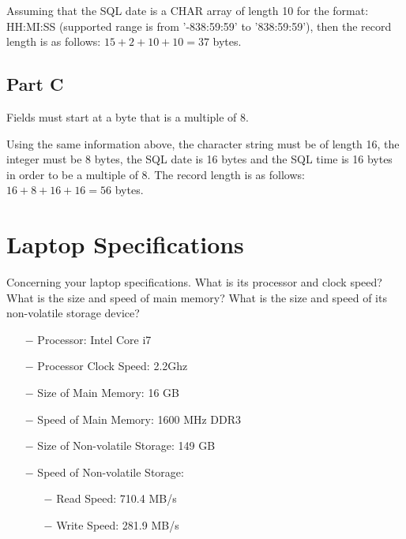 \documentclass [a4paper,12pt] {article}
\begin{document}
        \vspace{.2in}

        Assuming that the SQL date is a CHAR array of length 10 for the format:
        HH:MI:SS (supported range is from  '-838:59:59' to '838:59:59'), then
        the record length is as follows: \(15 + 2 + 10 + 10 = 37 \) bytes.
    \subsection {Part C}
        Fields must start at a byte that is a multiple of 8.

        \vspace{.2in}

        Using the same information above, the character string must be of length
        16, the integer must be 8 bytes, the SQL date is 16 bytes and the SQL time
        is 16 bytes in order to be a multiple of 8. The record length is as follows:
        \(16 + 8 + 16 + 16 = 56\) bytes.

\section{Laptop Specifications}
    Concerning your laptop specifications. What is its processor and clock speed? 
    What is the size and speed of main memory? What is the size and speed of its 
    non-volatile storage device?

    \begin{itemize}
        \item[$-$]Processor: Intel Core i7
        \item[$-$]Processor Clock Speed: 2.2Ghz
        \item[$-$]Size of Main Memory: 16 GB
        \item[$-$]Speed of Main Memory: 1600 MHz DDR3
        \item[$-$]Size of Non-volatile Storage: 149 GB
        \item[$-$]Speed of Non-volatile Storage:
        \begin{itemize}
            \item[$-$]Read Speed: 710.4 MB/s
            \item[$-$]Write Speed: 281.9 MB/s
        \end{itemize}
    \end{itemize}
\end{document}
